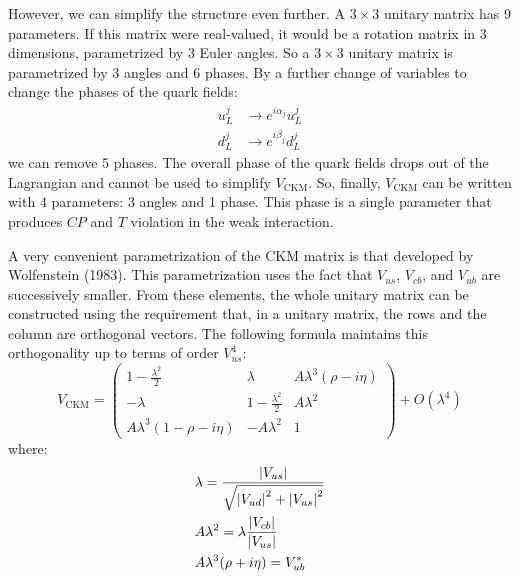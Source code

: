 \documentclass[../../main/main.tex]{subfiles}
\begin{document}
However, we can simplify the structure even further. A \( 3 \times 3 \) unitary matrix has 9 parameters. If this matrix were real-valued, it would be a rotation matrix in 3 dimensions, parametrized by 3 Euler angles. So a \( 3 \times 3 \) unitary matrix is parametrized by 3 angles and 6 phases. By a further change of variables to change the phases of the quark fields:
\begin{align}
	u^{j}_L &\longrightarrow e^{i\alpha_j}u^{j}_L	\\
	d^{j}_L &\longrightarrow e^{i\beta_j} d^{j}_L
\end{align}
we can remove 5 phases. The overall phase of the quark fields drops out of the Lagrangian and cannot be used to simplify \( V_{\mathrm{CKM}} \). So, finally, \( V_{\mathrm{CKM}} \) can be written with 4 parameters: 3 angles and 1 phase. This phase is a single parameter that produces \( CP \) and \( T \) violation in the weak interaction.

A very convenient parametrization of the CKM matrix is that developed by Wolfenstein (1983). This parametrization uses the fact that \( V_{us} \), \( V_{cb} \), and \( V_{ub} \) are successively smaller. From these elements, the whole unitary matrix can be constructed using the requirement that, in a unitary matrix, the rows and the column are orthogonal vectors. The following formula maintains this orthogonality up to terms of order \( V^4_{us} \):
\begin{equation}
	V_{\mathrm{CKM}}
	=
	\begin{pmatrix}
		1 - \frac{\lambda^2}{2}	&	\lambda	&	A\lambda^3(\rho - i\eta)	\\
		-\lambda	&	1 - \frac{\lambda^2}{2}	&	A\lambda^2	\\
		A\lambda^3(1 - \rho - i\eta)	&	-A\lambda^2	&	1
	\end{pmatrix}
	+
	O(\lambda^4)
	\label{eq:}
\end{equation}
where:
\begin{align}
	&\lambda = \frac{\abs{V_{us}}}{\sqrt{\abs{V_{ud}}^2 + \abs{V_{us}}^2}}	\\
	&A\lambda^2 = \lambda \frac{\abs{V_{cb}}}{\abs{V_{us}}}	\\
	&A\lambda^3(\rho +i\eta) = V^*_{ub}
\end{align}
\end{document}

